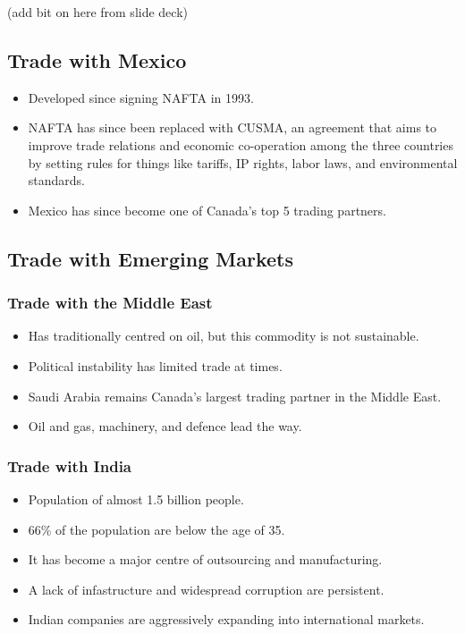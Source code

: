 (add bit on here from slide deck)
\subsection{Trade with Mexico}

\begin{itemize}
    \item Developed since signing NAFTA in 1993.
    \item NAFTA has since been replaced with CUSMA, an agreement that aims to improve trade relations and economic co-operation among the three countries by setting rules for things like tariffs, IP rights, labor laws, and environmental standards.
    \item Mexico has since become one of Canada's top 5 trading partners. 
\end{itemize}

\subsection{Trade with Emerging Markets}

\subsubsection{Trade with the Middle East}

\begin{itemize}
    \item Has traditionally centred on oil, but this commodity is not sustainable.
    \item Political instability has limited trade at times.
    \item Saudi Arabia remains Canada's largest trading partner in the Middle East.
    \item Oil and gas, machinery, and defence lead the way.
\end{itemize}

\subsubsection{Trade with India}

\begin{itemize}
    \item Population of almost 1.5 billion people.
    \item 66\% of the population are below the age of 35.
    \item It has become a major centre of outsourcing and manufacturing.
    \item A lack of infastructure and widespread corruption are persistent.
    \item Indian companies are aggressively expanding into international markets.
\end{itemize}

